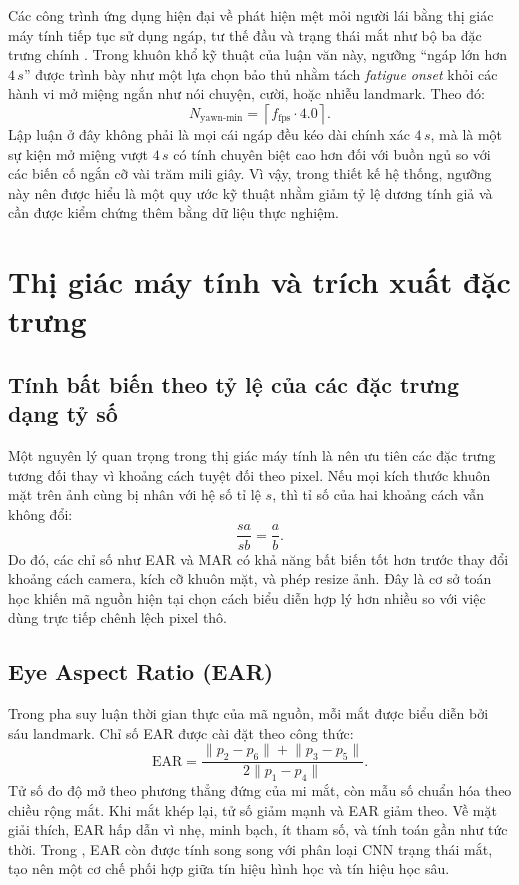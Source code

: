 \documentclass[12pt,a4paper]{article}
\begin{document}
Các công trình ứng dụng hiện đại về phát hiện mệt mỏi người lái bằng thị giác máy tính tiếp tục sử dụng ngáp, tư thế đầu và trạng thái mắt như bộ ba đặc trưng chính \cite{dong2022,review2022}. Trong khuôn khổ kỹ thuật của luận văn này, ngưỡng ``ngáp lớn hơn \(4\,s\)'' được trình bày như một lựa chọn bảo thủ nhằm tách \textit{fatigue onset} khỏi các hành vi mở miệng ngắn như nói chuyện, cười, hoặc nhiễu landmark. Theo đó:
\[
N_{\text{yawn-min}} = \left\lceil f_{\text{fps}} \cdot 4.0 \right\rceil.
\]
Lập luận ở đây không phải là mọi cái ngáp đều kéo dài chính xác \(4\,s\), mà là một sự kiện mở miệng vượt \(4\,s\) có tính chuyên biệt cao hơn đối với buồn ngủ so với các biến cố ngắn cỡ vài trăm mili giây. Vì vậy, trong thiết kế hệ thống, ngưỡng này nên được hiểu là một quy ước kỹ thuật nhằm giảm tỷ lệ dương tính giả và cần được kiểm chứng thêm bằng dữ liệu thực nghiệm.

\section{Thị giác máy tính và trích xuất đặc trưng}
\subsection{Tính bất biến theo tỷ lệ của các đặc trưng dạng tỷ số}
Một nguyên lý quan trọng trong thị giác máy tính là nên ưu tiên các đặc trưng tương đối thay vì khoảng cách tuyệt đối theo pixel. Nếu mọi kích thước khuôn mặt trên ảnh cùng bị nhân với hệ số tỉ lệ \(s\), thì tỉ số của hai khoảng cách vẫn không đổi:
\[
\frac{s a}{s b} = \frac{a}{b}.
\]
Do đó, các chỉ số như EAR và MAR có khả năng bất biến tốt hơn trước thay đổi khoảng cách camera, kích cỡ khuôn mặt, và phép resize ảnh. Đây là cơ sở toán học khiến mã nguồn hiện tại chọn cách biểu diễn hợp lý hơn nhiều so với việc dùng trực tiếp chênh lệch pixel thô.

\subsection{Eye Aspect Ratio (EAR)}
Trong pha suy luận thời gian thực của mã nguồn, mỗi mắt được biểu diễn bởi sáu landmark. Chỉ số EAR được cài đặt theo công thức:
\[
\mathrm{EAR} = \frac{\lVert p_2 - p_6 \rVert + \lVert p_3 - p_5 \rVert}{2\lVert p_1 - p_4 \rVert}.
\]
Tử số đo độ mở theo phương thẳng đứng của mi mắt, còn mẫu số chuẩn hóa theo chiều rộng mắt. Khi mắt khép lại, tử số giảm mạnh và EAR giảm theo. Về mặt giải thích, EAR hấp dẫn vì nhẹ, minh bạch, ít tham số, và tính toán gần như tức thời. Trong , EAR còn được tính song song với phân loại CNN trạng thái mắt, tạo nên một cơ chế phối hợp giữa tín hiệu hình học và tín hiệu học sâu.
\end{document}
